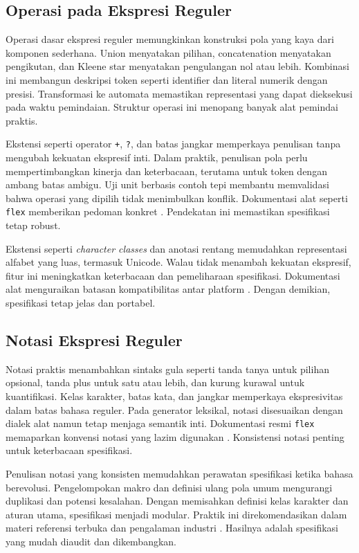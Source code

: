 \documentclass[../main.tex]{subfiles}
\begin{document}
\subsection{Operasi pada Ekspresi Reguler}
Operasi dasar ekspresi reguler memungkinkan konstruksi pola yang kaya dari komponen sederhana. Union menyatakan pilihan, concatenation menyatakan pengikutan, dan Kleene star menyatakan pengulangan nol atau lebih. Kombinasi ini membangun deskripsi token seperti identifier dan literal numerik dengan presisi. Transformasi ke automata memastikan representasi yang dapat dieksekusi pada waktu pemindaian. Struktur operasi ini menopang banyak alat pemindai praktis.

Ekstensi seperti operator \texttt{+}, \texttt{?}, dan batas jangkar memperkaya penulisan tanpa mengubah kekuatan ekspresif inti. Dalam praktik, penulisan pola perlu mempertimbangkan kinerja dan keterbacaan, terutama untuk token dengan ambang batas ambigu. Uji unit berbasis contoh tepi membantu memvalidasi bahwa operasi yang dipilih tidak menimbulkan konflik. Dokumentasi alat seperti \texttt{flex} memberikan pedoman konkret \citep{FlexManual}. Pendekatan ini memastikan spesifikasi tetap robust.

Ekstensi seperti \emph{character classes} dan anotasi rentang memudahkan representasi alfabet yang luas, termasuk Unicode. Walau tidak menambah kekuatan ekspresif, fitur ini meningkatkan keterbacaan dan pemeliharaan spesifikasi. Dokumentasi alat menguraikan batasan kompatibilitas antar platform \citep{FlexManual}. Dengan demikian, spesifikasi tetap jelas dan portabel.

\subsection{Notasi Ekspresi Reguler}
Notasi praktis menambahkan sintaks gula seperti tanda tanya untuk pilihan opsional, tanda plus untuk satu atau lebih, dan kurung kurawal untuk kuantifikasi. Kelas karakter, batas kata, dan jangkar memperkaya ekspresivitas dalam batas bahasa reguler. Pada generator leksikal, notasi disesuaikan dengan dialek alat namun tetap menjaga semantik inti. Dokumentasi resmi \texttt{flex} memaparkan konvensi notasi yang lazim digunakan \citep{FlexManual}. Konsistensi notasi penting untuk keterbacaan spesifikasi.

Penulisan notasi yang konsisten memudahkan perawatan spesifikasi ketika bahasa berevolusi. Pengelompokan makro dan definisi ulang pola umum mengurangi duplikasi dan potensi kesalahan. Dengan memisahkan definisi kelas karakter dan aturan utama, spesifikasi menjadi modular. Praktik ini direkomendasikan dalam materi referensi terbuka dan pengalaman industri \citep{FlexManual,CS143}. Hasilnya adalah spesifikasi yang mudah diaudit dan dikembangkan.
\end{document}
